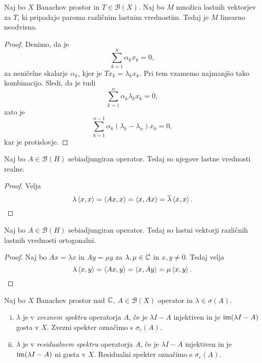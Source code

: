 \obvs

\begin{trditev}
Naj bo $X$ Banachov prostor in $T \in \mathcal{B}(X)$. Naj bo $M$
množica lastnih vektorjev za $T$, ki pripadajo paroma različnim
lastnim vrednostim. Tedaj je $M$ linearno neodvisna.
\end{trditev}

\begin{proof}
Denimo, da je
\[
\sum_{k=1}^n \alpha_k x_k = 0,
\]
za neničelne skalarje $\alpha_k$, kjer je $Tx_k = \lambda_k x_k$.
Pri tem vzamemo najmanjšo tako kombinacijo. Sledi, da je tudi
\[
\sum_{k=1}^n \alpha_k \lambda_k x_k = 0,
\]
zato je
\[
\sum_{k=1}^{n-1} \alpha_k (\lambda_k - \lambda_n) x_k = 0,
\]
kar je protislovje.
\end{proof}

\begin{trditev}
Naj bo $A \in \mathcal{B}(H)$ sebiadjungiran operator. Tedaj so
njegove lastne vrednosti realne.
\end{trditev}

\begin{proof}
Velja
\[
\lambda \left\langle x,x\right\rangle = \left\langle Ax,x\right\rangle =
\left\langle x,Ax\right\rangle = \overline{\lambda} \left\langle x,x\right\rangle. \qedhere
\]
\end{proof}

\begin{trditev}
Naj bo $A \in \mathcal{B}(H)$ sebiadjungiran operator. Tedaj so
lastni vektorji različnih lastnih vrednosti ortogonalni.
\end{trditev}

\begin{proof}
Naj bo $Ax = \lambda x$ in $Ay = \mu y$ za $\lambda, \mu \in \mathbb{C}$ in
$x,y \ne 0$. Tedaj velja
\[
\lambda \left\langle x,y\right\rangle = \left\langle Ax,y\right\rangle = \left\langle x,Ay\right\rangle = \mu \left\langle x,y\right\rangle.
\qedhere
\]
\end{proof}

\begin{definicija}
Naj bo $X$ Banachov prostor nad $\mathbb{C}$, $A \in \mathcal{B}(X)$
operator in $\lambda \in \sigma(A)$.

\begin{enumerate}[i)]
\item $\lambda$ je v \emph{zveznem spektru} operatorja $A$, če je
$\lambda I - A$ injektiven in je $\operatorname{im}(\lambda I - A)$ gosta v $X$.
Zvezni spekter označimo s $\sigma_c(A)$.
\item $\lambda$ je v \emph{residualnem spektru} operatorja $A$, če
je $\lambda I - A$ injektiven in je $\operatorname{im}(\lambda I - A)$ ni gosta v
$X$. Residualni spekter označimo s $\sigma_r(A)$.
\end{enumerate}
\end{definicija}

